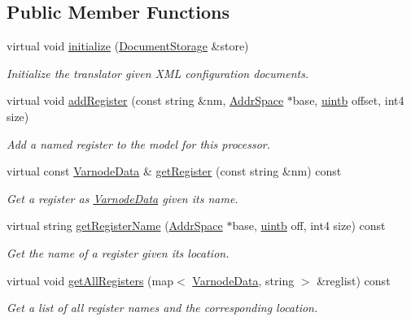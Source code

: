 \subsection*{Public Member Functions}
\begin{DoxyCompactItemize}
\item 
virtual void \mbox{\hyperlink{class_dummy_translate_a25f1165b176b80b6b8d1a4230230c97e}{initialize}} (\mbox{\hyperlink{class_document_storage}{Document\+Storage}} \&store)
\begin{DoxyCompactList}\small\item\em Initialize the translator given X\+ML configuration documents. \end{DoxyCompactList}\item 
virtual void \mbox{\hyperlink{class_dummy_translate_a31a861eddfd5416506d306b9578b2b2a}{add\+Register}} (const string \&nm, \mbox{\hyperlink{class_addr_space}{Addr\+Space}} $\ast$base, \mbox{\hyperlink{types_8h_a2db313c5d32a12b01d26ac9b3bca178f}{uintb}} offset, int4 size)
\begin{DoxyCompactList}\small\item\em Add a named register to the model for this processor. \end{DoxyCompactList}\item 
virtual const \mbox{\hyperlink{struct_varnode_data}{Varnode\+Data}} \& \mbox{\hyperlink{class_dummy_translate_a4c030a80bc088c90ffff5b7a0a78434d}{get\+Register}} (const string \&nm) const
\begin{DoxyCompactList}\small\item\em Get a register as \mbox{\hyperlink{struct_varnode_data}{Varnode\+Data}} given its name. \end{DoxyCompactList}\item 
virtual string \mbox{\hyperlink{class_dummy_translate_a231482a0c58ac93facbc643960a81891}{get\+Register\+Name}} (\mbox{\hyperlink{class_addr_space}{Addr\+Space}} $\ast$base, \mbox{\hyperlink{types_8h_a2db313c5d32a12b01d26ac9b3bca178f}{uintb}} off, int4 size) const
\begin{DoxyCompactList}\small\item\em Get the name of a register given its location. \end{DoxyCompactList}\item 
virtual void \mbox{\hyperlink{class_dummy_translate_a6a27ba7b3c1826c28a5b20d6d6609717}{get\+All\+Registers}} (map$<$ \mbox{\hyperlink{struct_varnode_data}{Varnode\+Data}}, string $>$ \&reglist) const
\begin{DoxyCompactList}\small\item\em Get a list of all register names and the corresponding location. \end{DoxyCompactList}\item 

\end{DoxyCompactItemize}
